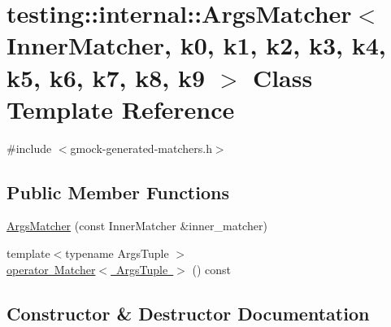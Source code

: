 \hypertarget{classtesting_1_1internal_1_1ArgsMatcher}{}\section{testing\+::internal\+::Args\+Matcher$<$ Inner\+Matcher, k0, k1, k2, k3, k4, k5, k6, k7, k8, k9 $>$ Class Template Reference}
\label{classtesting_1_1internal_1_1ArgsMatcher}


{\ttfamily \#include $<$gmock-\/generated-\/matchers.\+h$>$}

\subsection*{Public Member Functions}
\begin{DoxyCompactItemize}
\item 
\mbox{\hyperlink{classtesting_1_1internal_1_1ArgsMatcher_a2879d7455f2da2a5a2f2b6759dbc0561}{Args\+Matcher}} (const Inner\+Matcher \&inner\+\_\+matcher)
\item 
{\footnotesize template$<$typename Args\+Tuple $>$ }\\\mbox{\hyperlink{classtesting_1_1internal_1_1ArgsMatcher_ad55698b0de384a9d8875cef5b172cb4a}{operator Matcher$<$ Args\+Tuple $>$}} () const
\end{DoxyCompactItemize}


\subsection{Constructor \& Destructor Documentation}
\mbox{\label{classtesting_1_1internal_1_1ArgsMatcher_a2879d7455f2da2a5a2f2b6759dbc0561}} 
